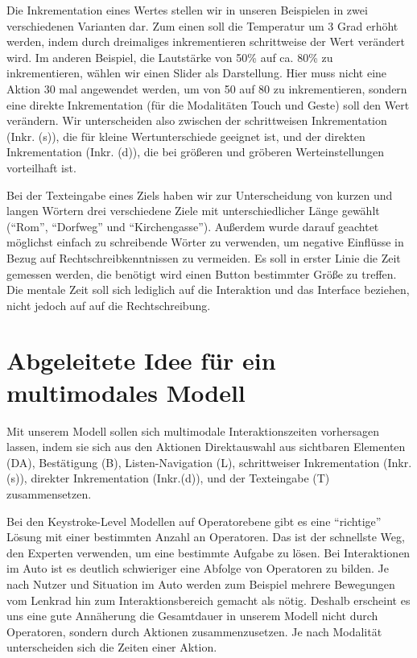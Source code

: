 Die Inkrementation eines Wertes stellen wir in unseren Beispielen in zwei verschiedenen Varianten dar. 
Zum einen soll die Temperatur um 3 Grad erhöht werden, indem durch dreimaliges inkrementieren schrittweise der Wert verändert wird. 
Im anderen Beispiel, die Lautstärke von 50\% auf ca. 80\% zu inkrementieren, wählen wir einen Slider als Darstellung. 
Hier muss nicht eine Aktion 30 mal angewendet werden, um von 50 auf 80 zu inkrementieren, sondern eine direkte Inkrementation (für die Modalitäten Touch und Geste) soll den Wert verändern. 
Wir unterscheiden also zwischen der schrittweisen Inkrementation (Inkr. (s)), die für kleine Wertunterschiede geeignet ist, und der direkten Inkrementation (Inkr. (d)), die bei größeren und gröberen Werteinstellungen vorteilhaft ist.

Bei der Texteingabe eines Ziels haben wir zur Unterscheidung von kurzen und langen Wörtern drei verschiedene Ziele mit unterschiedlicher Länge gewählt ("`Rom"', "`Dorfweg"' und "`Kirchengasse"'). 
Außerdem wurde darauf geachtet möglichst einfach zu schreibende Wörter zu verwenden, um negative Einflüsse in Bezug auf Rechtschreibkenntnissen zu vermeiden. 
Es soll in erster Linie die Zeit gemessen werden, die benötigt wird einen Button bestimmter Größe zu treffen. 
Die mentale Zeit soll sich lediglich auf die Interaktion und das Interface beziehen, nicht jedoch auf auf die Rechtschreibung. 

\section[Idee des Modells]{Abgeleitete Idee für ein multimodales Modell}
Mit unserem Modell sollen sich multimodale Interaktionszeiten vorhersagen lassen, indem sie sich aus den Aktionen Direktauswahl aus sichtbaren Elementen (DA), Bestätigung (B), Listen-Navigation (L), schrittweiser Inkrementation (Inkr.(s)), direkter Inkrementation (Inkr.(d)), und der Texteingabe (T) zusammensetzen.

Bei den Keystroke-Level Modellen auf Operatorebene gibt es eine "`richtige"' Lösung mit einer bestimmten Anzahl an Operatoren. 
Das ist der schnellste Weg, den Experten verwenden, um eine bestimmte Aufgabe zu lösen. 
Bei Interaktionen im Auto ist es deutlich schwieriger eine Abfolge von Operatoren zu bilden. 
Je nach Nutzer und Situation im Auto werden zum Beispiel mehrere Bewegungen vom Lenkrad hin zum Interaktionsbereich gemacht als nötig. 
Deshalb erscheint es uns eine gute Annäherung die Gesamtdauer in unserem Modell nicht durch Operatoren, sondern durch Aktionen zusammenzusetzen. 
Je nach Modalität unterscheiden sich die Zeiten einer Aktion. 

